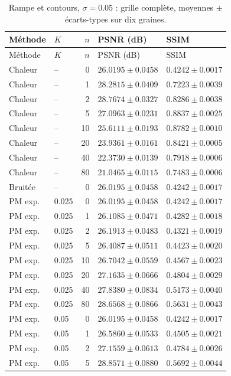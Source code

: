 \begin{longtable}{llrll}
\caption{Rampe et contours, $\sigma=0.05$ : grille complète, moyennes $\pm$ écarts-types sur dix graines.}\\
\toprule
Méthode & $K$ & $n$ & PSNR (dB) & SSIM \\
\midrule
\endfirsthead
\toprule
Méthode & $K$ & $n$ & PSNR (dB) & SSIM \\
\midrule
\endhead
\bottomrule
\endfoot
Chaleur & -- & 0 & $26.0195 \pm 0.0458$ & $0.4242 \pm 0.0017$ \\
Chaleur & -- & 1 & $28.2815 \pm 0.0409$ & $0.7223 \pm 0.0039$ \\
Chaleur & -- & 2 & $28.7674 \pm 0.0327$ & $0.8286 \pm 0.0038$ \\
Chaleur & -- & 5 & $27.0963 \pm 0.0231$ & $0.8837 \pm 0.0025$ \\
Chaleur & -- & 10 & $25.6111 \pm 0.0193$ & $0.8782 \pm 0.0010$ \\
Chaleur & -- & 20 & $23.9361 \pm 0.0161$ & $0.8421 \pm 0.0005$ \\
Chaleur & -- & 40 & $22.3730 \pm 0.0139$ & $0.7918 \pm 0.0006$ \\
Chaleur & -- & 80 & $21.0465 \pm 0.0115$ & $0.7483 \pm 0.0006$ \\
Bruitée & -- & 0 & $26.0195 \pm 0.0458$ & $0.4242 \pm 0.0017$ \\
PM exp. & 0.025 & 0 & $26.0195 \pm 0.0458$ & $0.4242 \pm 0.0017$ \\
PM exp. & 0.025 & 1 & $26.1085 \pm 0.0471$ & $0.4282 \pm 0.0018$ \\
PM exp. & 0.025 & 2 & $26.1913 \pm 0.0483$ & $0.4321 \pm 0.0019$ \\
PM exp. & 0.025 & 5 & $26.4087 \pm 0.0511$ & $0.4423 \pm 0.0020$ \\
PM exp. & 0.025 & 10 & $26.7042 \pm 0.0559$ & $0.4567 \pm 0.0023$ \\
PM exp. & 0.025 & 20 & $27.1635 \pm 0.0666$ & $0.4804 \pm 0.0029$ \\
PM exp. & 0.025 & 40 & $27.8380 \pm 0.0834$ & $0.5173 \pm 0.0040$ \\
PM exp. & 0.025 & 80 & $28.6568 \pm 0.0866$ & $0.5631 \pm 0.0043$ \\
PM exp. & 0.05 & 0 & $26.0195 \pm 0.0458$ & $0.4242 \pm 0.0017$ \\
PM exp. & 0.05 & 1 & $26.5860 \pm 0.0533$ & $0.4505 \pm 0.0021$ \\
PM exp. & 0.05 & 2 & $27.1559 \pm 0.0613$ & $0.4784 \pm 0.0026$ \\
PM exp. & 0.05 & 5 & $28.8571 \pm 0.0880$ & $0.5692 \pm 0.0044$ \\

\end{longtable}
